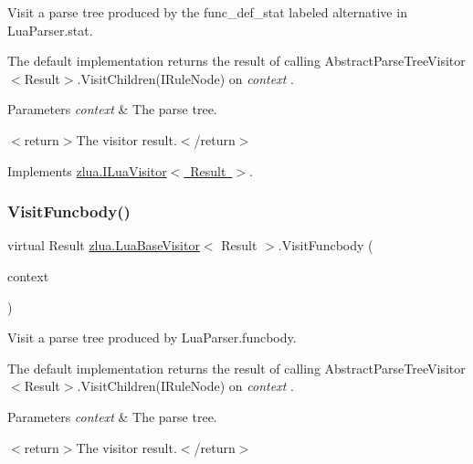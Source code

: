 Visit a parse tree produced by the {\ttfamily func\+\_\+def\+\_\+stat} labeled alternative in Lua\+Parser.\+stat. 

The default implementation returns the result of calling Abstract\+Parse\+Tree\+Visitor$<$\+Result$>$.\+Visit\+Children(\+I\+Rule\+Node) on {\itshape context} . 


\begin{DoxyParams}{Parameters}
{\em context} & The parse tree.\\
\hline
\end{DoxyParams}
$<$return$>$The visitor result.$<$/return$>$ 

Implements \mbox{\hyperlink{interfacezlua_1_1_i_lua_visitor_a784e05c705956dc10a1df269f7efbb3c}{zlua.\+I\+Lua\+Visitor$<$ Result $>$}}.

\mbox{\label{classzlua_1_1_lua_base_visitor_a489f2fe8dfd967614367a84330275c33}} 
\subsubsection{\texorpdfstring{Visit\+Funcbody()}{VisitFuncbody()}}
{\footnotesize\ttfamily virtual Result \mbox{\hyperlink{classzlua_1_1_lua_base_visitor}{zlua.\+Lua\+Base\+Visitor}}$<$ Result $>$.Visit\+Funcbody (\begin{DoxyParamCaption}\item[{\mbox{[}\+Not\+Null\mbox{]} \mbox{\hyperlink{classzlua_1_1_lua_parser_1_1_funcbody_context}{Lua\+Parser.\+Funcbody\+Context}}}]{context }\end{DoxyParamCaption})\hspace{0.3cm}{\ttfamily [virtual]}}



Visit a parse tree produced by Lua\+Parser.\+funcbody. 

The default implementation returns the result of calling Abstract\+Parse\+Tree\+Visitor$<$\+Result$>$.\+Visit\+Children(\+I\+Rule\+Node) on {\itshape context} . 


\begin{DoxyParams}{Parameters}
{\em context} & The parse tree.\\
\hline
\end{DoxyParams}
$<$return$>$The visitor result.$<$/return$>$ 

